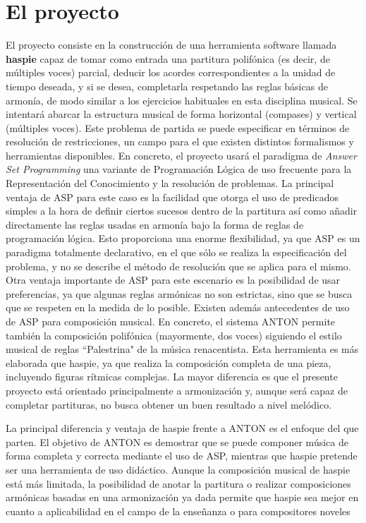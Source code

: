  \section{El proyecto}
  \label{sec:the_project}
 El proyecto consiste en la construcción de una herramienta software llamada \textbf{haspie} capaz de tomar como entrada una partitura polifónica (es decir, de múltiples voces) parcial, deducir los acordes correspondientes a la unidad de tiempo deseada, y si se desea, completarla respetando las reglas básicas de armonía, de modo similar a los ejercicios habituales en esta disciplina musical. Se intentará abarcar la estructura musical de forma horizontal (compases) y vertical (múltiples voces). Este problema de partida se puede especificar en términos de resolución de restricciones, un campo para el que existen distintos formalismos y herramientas disponibles. En concreto, el proyecto usará el paradigma de \textit{Answer Set Programming} una variante de Programación Lógica de uso frecuente para la Representación del Conocimiento y la resolución de problemas. La principal ventaja de ASP para este caso es la facilidad que otorga el uso de predicados simples a la hora de definir ciertos sucesos dentro de la partitura así como añadir directamente las reglas usadas en armonía bajo la forma de reglas de programación lógica. Esto proporciona una enorme flexibilidad, ya que ASP es un paradigma totalmente declarativo, en el que sólo se realiza la especificación del problema, y no se describe el método de resolución que se aplica para el mismo. Otra ventaja importante de ASP para este escenario es la posibilidad de usar preferencias, ya que algunas reglas armónicas no son estrictas, sino que se busca que se respeten en la medida de lo posible. Existen además antecedentes de uso de ASP para composición musical. En concreto, el sistema ANTON\cite{anton-composing} permite también la composición polifónica (mayormente, dos voces) siguiendo el estilo musical de reglas ``Palestrina"\cite{palestrina-rules} de la música renacentista. Esta herramienta es más elaborada que haspie, ya que realiza la composición completa de una pieza, incluyendo figuras rítmicas complejas. La mayor diferencia es que el presente proyecto está orientado principalmente a armonización y, aunque será capaz de completar partituras, no busca obtener un buen resultado a nivel melódico.
 
 La principal diferencia y ventaja de haspie frente a ANTON es el enfoque del que parten. El objetivo de ANTON es demostrar que se puede componer música de forma completa y correcta mediante el uso de ASP, mientras que haspie pretende ser una herramienta de uso didáctico.
 Aunque la composición musical de haspie está más limitada, la posibilidad de anotar la partitura o realizar composiciones armónicas basadas en una armonización ya dada permite que haspie sea mejor en cuanto a aplicabilidad en el campo de la enseñanza o para compositores noveles
 
